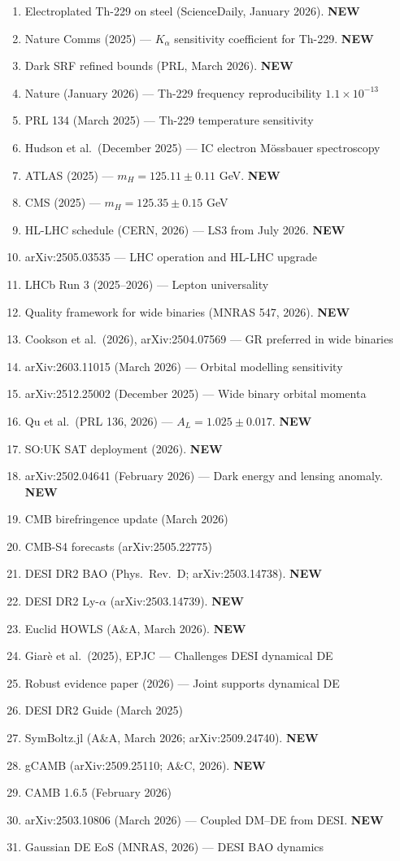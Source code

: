 \documentclass[11pt,a4paper]{article}
\newcommand{\NEW}{\textcolor{dfdblue}{\textbf{NEW}}}
\begin{document}
\begin{enumerate}
\item Electroplated Th-229 on steel (ScienceDaily, January 2026). \NEW
\item Nature Comms (2025) --- $K_\alpha$ sensitivity coefficient for Th-229. \NEW
\item Dark SRF refined bounds (PRL, March 2026). \NEW
\item Nature (January 2026) --- Th-229 frequency reproducibility $1.1 \times 10^{-13}$
\item PRL 134 (March 2025) --- Th-229 temperature sensitivity
\item Hudson et al.\ (December 2025) --- IC electron M\"ossbauer spectroscopy
\item ATLAS (2025) --- $m_H = 125.11 \pm 0.11$ GeV. \NEW
\item CMS (2025) --- $m_H = 125.35 \pm 0.15$ GeV
\item HL-LHC schedule (CERN, 2026) --- LS3 from July 2026. \NEW
\item arXiv:2505.03535 --- LHC operation and HL-LHC upgrade
\item LHCb Run 3 (2025--2026) --- Lepton universality
\item Quality framework for wide binaries (MNRAS 547, 2026). \NEW
\item Cookson et al.\ (2026), arXiv:2504.07569 --- GR preferred in wide binaries
\item arXiv:2603.11015 (March 2026) --- Orbital modelling sensitivity
\item arXiv:2512.25002 (December 2025) --- Wide binary orbital momenta
\item Qu et al.\ (PRL 136, 2026) --- $A_L = 1.025 \pm 0.017$. \NEW
\item SO:UK SAT deployment (2026). \NEW
\item arXiv:2502.04641 (February 2026) --- Dark energy and lensing anomaly. \NEW
\item CMB birefringence update (March 2026)
\item CMB-S4 forecasts (arXiv:2505.22775)
\item DESI DR2 BAO (Phys.\ Rev.\ D; arXiv:2503.14738). \NEW
\item DESI DR2 Ly-$\alpha$ (arXiv:2503.14739). \NEW
\item Euclid HOWLS (A\&A, March 2026). \NEW
\item Giar\`e et al.\ (2025), EPJC --- Challenges DESI dynamical DE
\item Robust evidence paper (2026) --- Joint supports dynamical DE
\item DESI DR2 Guide (March 2025)
\item SymBoltz.jl (A\&A, March 2026; arXiv:2509.24740). \NEW
\item gCAMB (arXiv:2509.25110; A\&C, 2026). \NEW
\item CAMB 1.6.5 (February 2026)
\item arXiv:2503.10806 (March 2026) --- Coupled DM--DE from DESI. \NEW
\item Gaussian DE EoS (MNRAS, 2026) --- DESI BAO dynamics
\end{enumerate}
\end{document}
